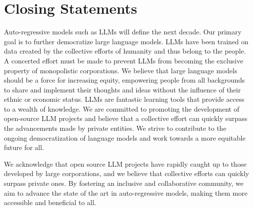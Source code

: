 \documentclass{article}
\begin{document}
\section {Closing Statements}
Auto-regressive models such as LLMs will define the next decade. Our primary goal is to further democratize large language models.
LLMs have been trained on data created by the collective efforts of humanity and thus belong to the people. 
A concerted effort must be made to prevent LLMs from becoming the exclusive property of monopolistic corporations. 
We believe that large language models should be a force for increasing equity, empowering people from all backgrounds to share and implement their thoughts and ideas without the influence of their ethnic or economic status. 
LLMs are fantastic learning tools that provide access to a wealth of knowledge. 
We are committed to promoting the development of open-source LLM projects and believe that a collective effort can quickly surpass the advancements made by private entities. 
We strive to contribute to the ongoing democratization of language models and work towards a more equitable future for all.

We acknowledge that open source LLM projects have rapidly caught up to those developed by large corporations, and we believe that collective efforts can quickly surpass private ones. 
By fostering an inclusive and collaborative community, we aim to advance the state of the art in auto-regressive models, making them more accessible and beneficial to all.
\end{document}

